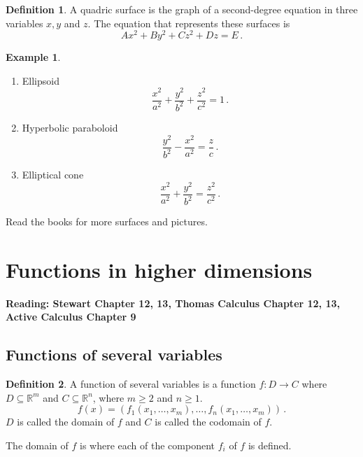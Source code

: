 \documentclass[
]{article}
\theoremstyle{definition}
\newtheorem{definition}{Definition}[section]
\theoremstyle{definition}
\newtheorem{example}{Example}[section]
\theoremstyle{definition}
\theoremstyle{definition}
\theoremstyle{remark}
\begin{document}
\begin{definition}
A quadric surface is the graph of a second-degree equation in three variables
\(x,y\) and \(z\).
The equation that represents these surfaces is
\[Ax^2 + By^2 + Cz^2 + Dz = E\,.\]
\end{definition}

\begin{example}
\leavevmode

\begin{enumerate}
\def\labelenumi{\arabic{enumi}.}
\item
  Ellipsoid
  \[\frac{x^2}{a^2} + \frac{y^2}{b^2} + \frac{z^2}{c^2} = 1\,. \]
\item
  Hyperbolic paraboloid
  \[\frac{y^2}{b^2} - \frac{x^2}{a^2} = \frac{z}{c} \,.\]
\item
  Elliptical cone
  \[\frac{x^2}{a^2} + \frac{y^2}{b^2} = \frac{z^2}{c^2} \,.\]
\end{enumerate}

Read the books for more surfaces and pictures.

\end{example}

\newpage

\hypertarget{functions-in-higher-dimensions}{%
\section{Functions in higher dimensions}\label{functions-in-higher-dimensions}}

\textbf{Reading: Stewart Chapter 12, 13, Thomas Calculus Chapter 12, 13, Active Calculus Chapter 9}

\hypertarget{functions-of-several-variables}{%
\subsection{Functions of several variables}\label{functions-of-several-variables}}

\begin{definition}
A function of several variables is a function
\(f: D \to C\) where \(D \subseteq \mathbb{R}^m\) and \(C \subseteq \mathbb{R}^n\), where \(m\geq 2\) and \(n\geq 1\).
\[f({x}) = ( f_1(x_1,\dots, x_m),\dots, f_n(x_1,\dots, x_m)  ) \,.\]
\(D\) is called the domain of \(f\) and \(C\) is called the codomain of \(f\).
\end{definition}

The domain of \(f\) is where each of the component \(f_i\) of \(f\) is defined.
\end{document}
